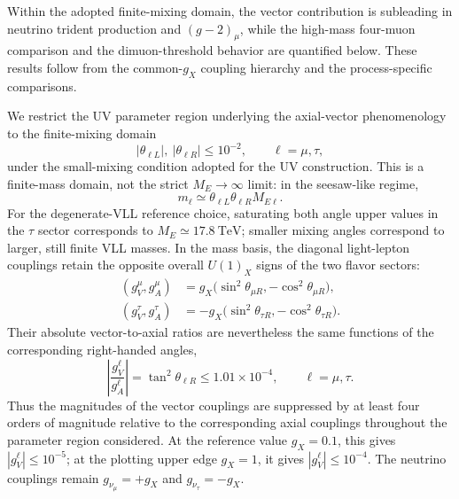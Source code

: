 \documentclass[12pt,a4paper]{article}
\begin{document}

Within the adopted finite-mixing domain, the vector contribution is subleading in neutrino trident production and \((g-2)_\mu\), while the high-mass four-muon comparison and the dimuon-threshold behavior are quantified below. These results follow from the common-\(g_X\) coupling hierarchy and the process-specific comparisons.

\medskip
{}

We restrict the UV parameter region underlying the axial-vector phenomenology to the finite-mixing domain
\[
|\theta_{\ell L}|,\ |\theta_{\ell R}|\leq10^{-2},\qquad \ell=\mu,\tau,
\]
under the small-mixing condition adopted for the UV construction. This is a finite-mass domain, not the strict \(M_E\to\infty\) limit: in the seesaw-like regime,
\[
m_\ell\simeq\theta_{\ell L}\theta_{\ell R}M_{E\ell}.
\]
For the degenerate-VLL reference choice, saturating both angle upper values in the \(\tau\) sector corresponds to \(M_E\simeq17.8~\mathrm{TeV}\); smaller mixing angles correspond to larger, still finite VLL masses. In the mass basis, the diagonal light-lepton couplings retain the opposite overall \(U(1)_X\) signs of the two flavor sectors:
\[
\begin{aligned}
(g_V^\mu,g_A^\mu)&=g_X\bigl(\sin^2\theta_{\mu R},-\cos^2\theta_{\mu R}\bigr),\\
(g_V^\tau,g_A^\tau)&=-g_X\bigl(\sin^2\theta_{\tau R},-\cos^2\theta_{\tau R}\bigr).
\end{aligned}
\]
Their absolute vector-to-axial ratios are nevertheless the same functions of the corresponding right-handed angles,
\[
\left|\frac{g_V^\ell}{g_A^\ell}\right|
=\tan^2\theta_{\ell R}\leq1.01\times10^{-4},
\qquad \ell=\mu,\tau.
\]
Thus the magnitudes of the vector couplings are suppressed by at least four orders of magnitude relative to the corresponding axial couplings throughout the parameter region considered. At the reference value \(g_X=0.1\), this gives \(|g_V^\ell|\leq10^{-5}\); at the plotting upper edge \(g_X=1\), it gives \(|g_V^\ell|\leq10^{-4}\). The neutrino couplings remain \(g_{\nu_\mu}=+g_X\) and \(g_{\nu_\tau}=-g_X\).

\medskip
{}
\end{document}
